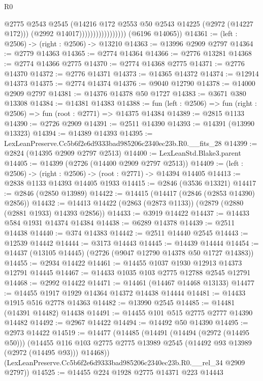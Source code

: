 \begin{lexlean}{R0}
\begin{coremodule}
                                      @2775
                                      @2543
                                      @2545
                                      (@14216 @172 @2553 @50 @2543 @14225 (@2972 (@14227 @172)))
                                      (@2992 @14017)))))))))))))))))
      (@6196 @14065))
@14361 := (left : @2506) -> (right : @2506) -> @13210
@14363 := @13996 @2909 @2797
@14364 := @2779 @14363
@14365 := @2774 @14364
@14366 := @2776 @13281
@14368 := @2774 @14366 @2775
@14370 := @2774 @14368 @2775
@14371 := @2776 @14370
@14372 := @2776 @14371
@14373 := @14365 @14372
@14374 := @12914 @14373
@14375 := @2774 @14374
@14376 := @9040 @12790
@14378 := @14000 @2909 @2797
@14381 := @14376 @14378 @50 @1727
@14383 := @3671 @380 @13308
@14384 := @14381 @14383
@14388 := fun (left : @2506) => fun (right : @2506) => fun (root : @2771) => @14375 @14384
@14389 := @2815 @1133
@14390 := @2726 @2909
@14391 := @2511 @14390
@14393 := @14391 (@13990 @13323)
@14394 := @14389 @14393
@14395 := LexLeanPreserve.Cc5b6f2e6d9333bad985206c2340ec23b.R0.__fits_28
@14399 := @2824 (@14395 @2909 @2797 @2513)
@14400 := LexLeanStd.Blake3.parent
@14405 := @14399 (@2726 (@14400 @2909 @2797 @2513))
@14409 := (left : @2506) -> (right : @2506) -> (root : @2771) -> @14394 @14405
@14413 := @2838 @1133 @14393 @14405 @1933
@14415 := @2846 (@3536 @13321)
@14417 := @2846 (@2850 @13989)
@14422 := @14415 (@14417 (@2846 (@2853 @14390) @2856))
@14432 := @14413 @14422 (@2863 (@2873 @1133)) (@2879 (@2880 (@2881 @1933) @14393 @2856))
@14433 := @3919 @14422
@14437 := @14433 @584 @1931 @14374 @14384
@14438 := @6289 @14378
@14439 := @2511 @14438
@14440 := @374 @14383
@14442 := @2511 @14440 @2545
@14443 := @12539 @14442
@14444 := @3173 @14443
@14445 := @14439 @14444
@14454 := @14437 (@13105 @14445) (@2726 (@9047 @12790 @14378 @50 @1727 @14383))
@14455 := @2934 @14422
@14461 := @14455 @1037 @1930 @12913 @14373 @12791 @14445
@14467 := @14433 @1035 @103 @2775 @12788 @2545 @12791
@14468 := @2992 @14422
@14471 := @14461 (@14467 @14468 @13133)
@14477 := @14455 @1917 @1929 @14364 @14372 @14438 @14444
@14481 := @14433 @1915 @516 @2778 @14363
@14482 := @13990 @2545
@14485 := @14481 (@14391 @14482) @14438
@14491 := @14455 @101 @515 @2775 @2777 @14390 @14482
@14492 := @2967 @14422
@14494 := @14492 @50 @14390
@14495 := @2973 @14422
@14519 := @14477
    (@14485
      (@14491
        (@14494 (@2972 (@14495 @50)))
        (@14455 @116 @103 @2775 @2775 @13989 @2545 (@14492 @93 @13989 (@2972 (@14495 @93))) @14468))
      (LexLeanPreserve.Cc5b6f2e6d9333bad985206c2340ec23b.R0.__rel_34 @2909 @2797))
@14525 := @14455 @224 @1928 @2775 @14371 @223 @14443

\end{coremodule}
\end{lexlean}
